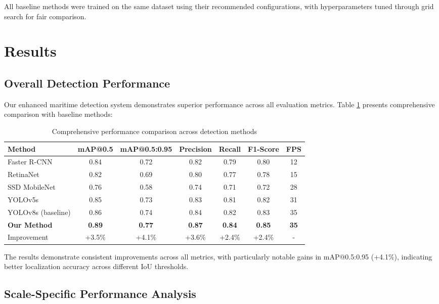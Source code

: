 \documentclass[10pt]{article}
\begin{document}
All baseline methods were trained on the same dataset using their recommended configurations, with hyperparameters tuned through grid search for fair comparison.

\section{Results}

\subsection{Overall Detection Performance}

Our enhanced maritime detection system demonstrates superior performance across all evaluation metrics. Table \ref{tab:main_results} presents comprehensive comparison with baseline methods:

\begin{table}[ht]
\centering
\caption{Comprehensive performance comparison across detection methods}
\label{tab:main_results}
\begin{tabular}{lcccccc}
\toprule
Method & mAP@0.5 & mAP@0.5:0.95 & Precision & Recall & F1-Score & FPS \\
\midrule
Faster R-CNN & 0.84 & 0.72 & 0.82 & 0.79 & 0.80 & 12 \\
RetinaNet & 0.82 & 0.69 & 0.80 & 0.77 & 0.78 & 15 \\
SSD MobileNet & 0.76 & 0.58 & 0.74 & 0.71 & 0.72 & 28 \\
YOLOv5s & 0.85 & 0.73 & 0.83 & 0.81 & 0.82 & 31 \\
YOLOv8s (baseline) & 0.86 & 0.74 & 0.84 & 0.82 & 0.83 & 35 \\
\textbf{Our Method} & \textbf{0.89} & \textbf{0.77} & \textbf{0.87} & \textbf{0.84} & \textbf{0.85} & \textbf{35} \\
\midrule
Improvement & +3.5\% & +4.1\% & +3.6\% & +2.4\% & +2.4\% & - \\
\bottomrule
\end{tabular}
\end{table}

The results demonstrate consistent improvements across all metrics, with particularly notable gains in mAP@0.5:0.95 (+4.1\%), indicating better localization accuracy across different IoU thresholds.

\subsection{Scale-Specific Performance Analysis}
\end{document}
